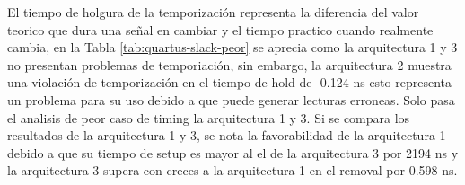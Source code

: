 \begin{table}[H]
  \centering
  \caption{Holgura del peor caso en el análisis de temporización multiesquina de Quartus. Todos los valores están en nanosegundos.}
  \label{tab:quartus-slack-peor}
\end{table}

El tiempo de holgura de la temporización representa la diferencia del valor teorico que dura una señal en cambiar y el tiempo practico cuando realmente cambia, en la Tabla \ref{tab:quartus-slack-peor} se aprecia como la arquitectura 1 y 3 no presentan problemas de temporiación, sin embargo, la arquitectura 2 muestra una violación de temporización en el tiempo de hold de -0.124 ns esto representa un problema para su uso debido a que puede generar lecturas erroneas. Solo pasa el analisis de peor caso de timing la arquitectura 1 y 3. Si se compara los resultados de la arquitectura 1 y 3, se nota la favorabilidad de la arquitectura 1 debido a que su tiempo de setup es mayor al el de la arquitectura 3 por 2194 ns y la arquitectura 3 supera con creces a la arquitectura 1 en el removal por 0.598 ns.

